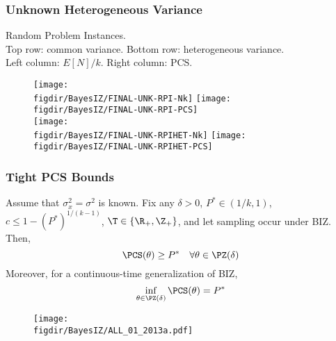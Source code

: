 {\begin{frame}
  \frametitle{Unknown Heterogeneous Variance}
  Random Problem Instances.  \\
  Top row: common variance.  Bottom row: heterogeneous variance.\\
  Left column: $E[N]/k$.  Right column: PCS.\\
  \begin{figure}
    \center
    \texttt{[image: \\figdir/BayesIZ/FINAL-UNK-RPI-Nk]} \texttt{[image: \\figdir/BayesIZ/FINAL-UNK-RPI-PCS]}\\
    \texttt{[image: \\figdir/BayesIZ/FINAL-UNK-RPIHET-Nk]} \texttt{[image: \\figdir/BayesIZ/FINAL-UNK-RPIHET-PCS]}\\
  \end{figure}
\end{frame}

\begin{frame}
  \frametitle{Tight PCS Bounds}
  \begin{theorem}
  Assume that $\sigma^2_x = \sigma^2$ is known.
  Fix any $\delta>0$, $P^* \in (1/k,1)$, $c \le 1-(P^*)^{1/(k-1)}$, $\T \in \{\R_+,\Z_+\}$, 
  and let sampling occur under BIZ.
  Then,
    \begin{equation*}
      \PCS(\theta) \ge P^*\quad \forall \theta\in\PZ(\delta)
    \end{equation*}
    Moreover, for a continuous-time generalization of BIZ,
    \begin{equation*}
      \inf_{\theta\in\PZ(\delta)} \PCS(\theta) = P^*
    \end{equation*}
  \end{theorem}
\end{frame}

\begin{frame}
  \begin{figure}
    \centering
    \texttt{[image: \\figdir/BayesIZ/ALL\_01\_2013a.pdf]} 
  \end{figure}
\end{frame}


}


